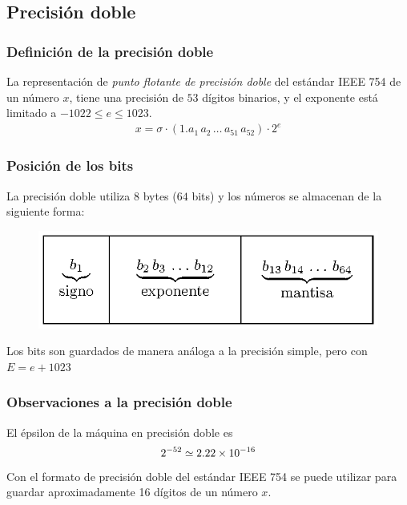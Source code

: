 \subsection{Precisión doble}
\begin{frame}
\frametitle{Definición de la precisión doble}
La representación de \emph{punto flotante de precisión doble} del estándar IEEE 754 de un número $x$, tiene una precisión de $53$ dígitos binarios, y el exponente está limitado a $-1022 \leq e \leq 1023$.
\begin{align*}
x = \sigma \cdot (1.a_{1} \, a_{2} \, \ldots \, a_{51} \, a_{52}) \cdot 2^{e}
\end{align*}
\end{frame}
\begin{frame}
\frametitle{Posición de los bits}
La precisión doble utiliza $8$ bytes ($64$ bits) y los números se almacenan de la siguiente forma:
\begin{figure}
    \centering
    \includegraphics[scale=1.2]{Imagenes/precision_doble.eps}
\end{figure}
\vspace*{-1cm}
Los bits son guardados de manera análoga a la precisión simple, pero con $E = e + 1023$
\end{frame}
\begin{frame}
\frametitle{Observaciones a la precisión doble}
El épsilon de la máquina en precisión doble es
\begin{align*}
2^{-52} \simeq \num{2.22d-16}
\end{align*}
\pause
Con el formato de precisión doble del estándar IEEE 754 se puede utilizar para guardar aproximadamente 16 dígitos de un número $x$.
\end{frame}
